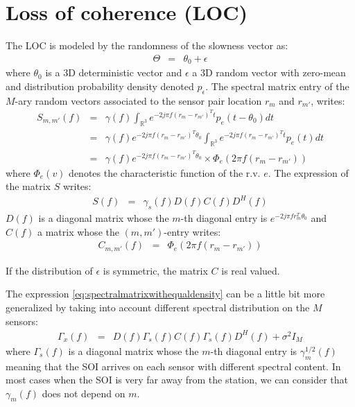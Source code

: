 \documentclass[a4paper, 12pt]{report}
\begin{document}
\section{Loss of coherence (LOC)}
The LOC is modeled by the randomness of the slowness vector as:
\begin{eqnarray*}
\Theta &=& \theta_0+\epsilon
\end{eqnarray*}
where $\theta_0$ is a 3D deterministic vector and $\epsilon$ a 3D random vector with zero-mean and distribution probability density denoted $p_{\epsilon}$. The spectral matrix entry of the $M$-ary random vectors associated to the sensor pair location $r_{m}$ and $r_{m'}$, writes:
\begin{eqnarray*}
S_{m,m'}(f) &=& \gamma(f)\int_{\mathds{R}^3}e^{-2j\pi f (r_{m}-r_{m'})^Tt}p_{e}(t-\theta_0)dt
\\
&=&\gamma(f)
e^{-2j\pi f (r_{m}-r_{m'})^T\theta_0}
\int_{\mathds{R}^3}e^{-2j\pi f (r_{m}-r_{m'})^Tt}p_{e}(t)dt
\\
&=&\gamma(f)
e^{-2j\pi f (r_{m}-r_{m'})^T\theta_0}\times
\Phi_{e}(2\pi f(r_{m}-r_{m'}))
\end{eqnarray*}
where $\Phi_{e}(v)$ denotes the characteristic function of the r.v. $e$. The expression of the matrix $S$ writes:
\begin{eqnarray}
\label{eq:spectralmatrixwithequaldensity}
 S(f) &=& \gamma_s(f)D(f)C(f)D^H(f)
\end{eqnarray}
$D(f)$ is a diagonal matrix whose the $m$-th diagonal entry is $e^{-2j\pi f r_{m}^T\theta_0}$ and $C(f)$ a matrix whose the $(m,m')$-entry writes:
\begin{eqnarray*}
 C_{m,m'}(f) &=& \Phi_{e}(2\pi f(r_{m}-r_{m'}))
\end{eqnarray*}

If the distribution of $\epsilon$ is symmetric, the matrix $C$ is real valued.


The expression \eqref{eq:spectralmatrixwithequaldensity} can be a little bit more generalized by taking into account different spectral distribution on the $M$ sensors:
\begin{eqnarray*}
 \Gamma_{x}(f)&=&D(f)\Gamma_{s}(f)C(f)\Gamma_{s}(f)D^{H}(f)+ \sigma^{2}I_M
\end{eqnarray*}
where $\Gamma_{s}(f)$ is a diagonal matrix whose the $m$-th diagonal entry is $\gamma_{m}^{1/2}(f)$ meaning that the SOI arrives on each sensor with different spectral content. In most cases when the SOI is very far away from the station, we can consider that $\gamma_{m}(f)$ does not depend on $m$.
\end{document}
